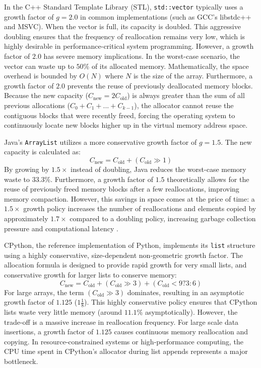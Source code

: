 In the C++ Standard Template Library (STL), \texttt{std::vector} typically uses 
a growth factor of $g = 2.0$ in common implementations (such as GCC's libstdc++ 
and MSVC). When the vector is full, its capacity is doubled. This aggressive 
doubling ensures that the frequency of reallocation remains very low, which is 
highly desirable in performance-critical system programming. However, a growth 
factor of $2.0$ has severe memory implications. In the worst-case scenario, the 
vector can waste up to $50\%$ of its allocated memory. Mathematically, the 
space overhead is bounded by $O(N)$ where $N$ is the size of the array. Furthermore, 
a growth factor of $2.0$ prevents the reuse of previously deallocated memory 
blocks. Because the new capacity ($C_{\text{new}} = 2 C_{\text{old}}$) is always 
greater than the sum of all previous allocations ($C_0 + C_1 + ... + C_{k-1}$), 
the allocator cannot reuse the contiguous blocks that were recently freed, 
forcing the operating system to continuously locate new blocks higher up in the 
virtual memory address space.

Java's \texttt{ArrayList} utilizes a more conservative growth factor of $g = 1.5$. 
The new capacity is calculated as:
\begin{equation}
    C_{\text{new}} = C_{\text{old}} + (C_{\text{old}} \gg 1)
\end{equation}
By growing by $1.5\times$ instead of doubling, Java reduces the worst-case 
memory waste to $33.3\%$. Furthermore, a growth factor of $1.5$ theoretically 
allows for the reuse of previously freed memory blocks after a few reallocations, 
improving memory compaction. However, this savings in space comes at the price 
of time: a $1.5\times$ growth policy increases the number of reallocations 
and elements copied by approximately $1.7\times$ compared to a doubling policy, 
increasing garbage collection pressure and computational latency \cite{java_data_structures}.

CPython, the reference implementation of Python, implements its \texttt{list} 
structure using a highly conservative, size-dependent non-geometric growth 
factor. The allocation formula is designed to provide rapid growth for very small 
lists, and conservative growth for larger lists to conserve memory:
\begin{equation}
    C_{\text{new}} = C_{\text{old}} + (C_{\text{old}} \gg 3) + (C_{\text{old}} < 9 ? 3 : 6)
\end{equation}
For large arrays, the term $(C_{\text{old}} \gg 3)$ dominates, resulting in an 
asymptotic growth factor of $1.125$ ($1 \frac{1}{8}$). This highly conservative 
policy ensures that CPython lists waste very little memory (around $11.1\%$ 
asymptotically). However, the trade-off is a massive increase in reallocation 
frequency. For large scale data insertions, a growth factor of $1.125$ causes 
continuous memory reallocation and copying. In resource-constrained systems or 
high-performance computing, the CPU time spent in CPython's allocator during 
list appends represents a major bottleneck.

